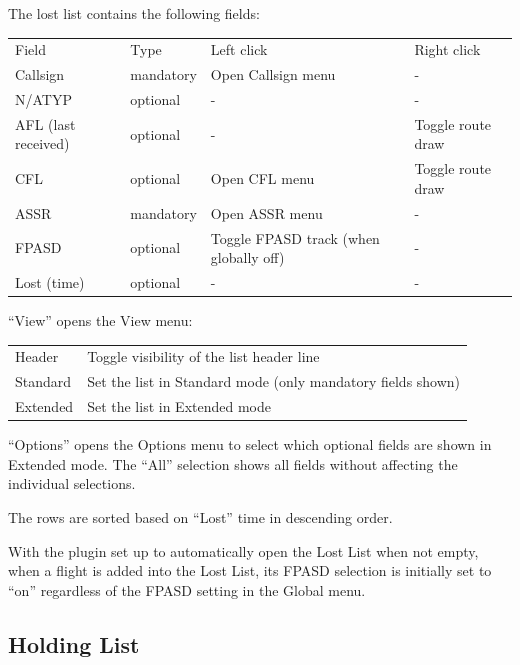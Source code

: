\documentclass[11pt,a4paper,oldfontcommands]{memoir}
\begin{document}
The lost list contains the following fields:

\begin{tabular}{l l l l}
    Field                   & Type        & Left click                              & Right click\\
    Callsign                & mandatory   & Open Callsign menu                      & -\\
    N/ATYP                  & optional    & -                                       & -\\
    AFL (last received)     & optional    & -                                       & Toggle route draw\\
    CFL                     & optional    & Open CFL menu                           & Toggle route draw\\
    ASSR                    & mandatory   & Open ASSR menu                          & -\\
    FPASD                   & optional    & Toggle FPASD track (when globally off)  & -\\
    Lost (time)             & optional    & -                                       & -\\
\end{tabular}

“View” opens the View menu:

\begin{tabular}{l l}
    Header      & Toggle visibility of the list header line\\
    Standard    & Set the list in Standard mode (only mandatory fields shown)\\
    Extended    & Set the list in Extended mode  \\
\end{tabular}

“Options” opens the Options menu to select which optional fields are shown in Extended mode. The “All” selection shows all fields without affecting the individual selections.

The rows are sorted based on “Lost” time in descending order.

With the plugin set up to automatically open the Lost List when not empty, when a flight is added into the Lost List, its FPASD selection is initially set to “on” regardless of the FPASD setting in the Global menu.

\subsection{Holding List}
\label{list:hold}
\end{document}
